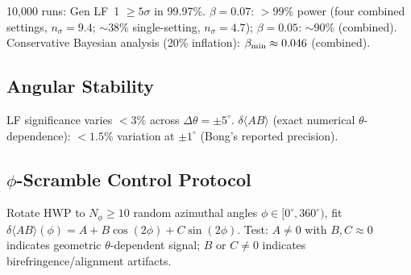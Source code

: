 \documentclass[12pt]{article}
\begin{document}
10{,}000 runs: Gen LF~1 $\ge 5\sigma$ in 99.97\%. $\beta = 0.07$: ${>}99\%$ power (four combined settings, $n_\sigma = 9.4$; $\sim$38\% single-setting, $n_\sigma = 4.7$); $\beta = 0.05$: $\sim$90\% (combined). Conservative Bayesian analysis (20\% inflation): $\beta_{\rm min} \approx 0.046$ (combined).

\subsection{Angular Stability}

LF significance varies ${<}3\%$ across $\Delta\theta = \pm 5^\circ$. $\delta\langle AB\rangle$ (exact numerical $\theta$-dependence): ${<}1.5\%$ variation at $\pm 1^\circ$ (Bong's reported precision).

\subsection{$\phi$-Scramble Control Protocol}

Rotate HWP to $N_\phi \geq 10$ random azimuthal angles $\phi \in [0^\circ, 360^\circ)$, fit $\delta\langle AB\rangle(\phi) = A + B\cos(2\phi) + C\sin(2\phi)$. Test: $A \neq 0$ with $B, C \approx 0$ indicates geometric $\theta$-dependent signal; $B$ or $C \neq 0$ indicates birefringence/alignment artifacts.
\end{document}
